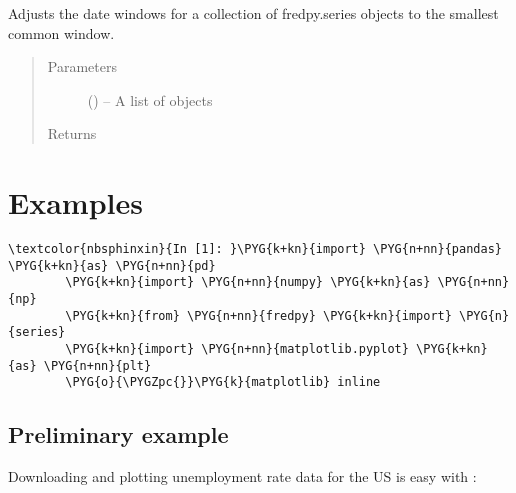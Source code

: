 \documentclass[letterpaper,10pt,openany,oneside,english]{sphinxmanual}
\begin{document}

\begin{fulllineitems}
\label{\detokenize{additional_functions:fredpy.window_equalize}}
Adjusts the date windows for a collection of fredpy.series objects to the smallest common window.
\begin{quote}\begin{description}
\item[{Parameters}] \leavevmode
{} (\href{https://docs.python.org/2/library/functions.html\#list}{}) -- A list of {\hyperref[\detokenize{series_class:fredpy.series}]{}} objects

\item[{Returns}] \leavevmode


\end{description}\end{quote}

\end{fulllineitems}



\section{ Examples}
\label{\detokenize{fredpy_examples::doc}}\label{\detokenize{fredpy_examples:fredpy-Examples}}
\begin{Verbatim}[commandchars=\\\{\}]
\textcolor{nbsphinxin}{In [1]: }\PYG{k+kn}{import} \PYG{n+nn}{pandas} \PYG{k+kn}{as} \PYG{n+nn}{pd}
        \PYG{k+kn}{import} \PYG{n+nn}{numpy} \PYG{k+kn}{as} \PYG{n+nn}{np}
        \PYG{k+kn}{from} \PYG{n+nn}{fredpy} \PYG{k+kn}{import} \PYG{n}{series}
        \PYG{k+kn}{import} \PYG{n+nn}{matplotlib.pyplot} \PYG{k+kn}{as} \PYG{n+nn}{plt}
        \PYG{o}{\PYGZpc{}}\PYG{k}{matplotlib} inline
\end{Verbatim}


\subsection{Preliminary example}
\label{\detokenize{fredpy_examples:Preliminary-example}}
Downloading and plotting unemployment rate data for the US is easy with
:
\end{document}
